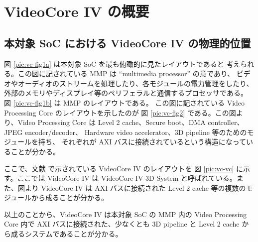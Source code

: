 \documentclass{jsarticle}
\begin{document}
\section{VideoCore IV の概要}

\subsection{本対象 SoC における VideoCore IV の物理的位置}

図 \ref{pic:vc-fig1a} は本対象 SoC を最も俯瞰的に見たレイアウトであると
考えられる。この図に記されている MMP は ``multimedia processor'' の意であり、
ビデオやオーディオのストリームを処理したり、各モジュールの電力管理をしたり、
外部のメモリやディスプレイ等のペリフェラルと通信するプロセッサである。
図 \ref{pic:vc-fig1b} は MMP のレイアウトである。
この図に記されている Video Processing Core のレイアウトを示したのが
図 \ref{pic:vc-fig2} である。この図より、Video Processing Core は
Level 2 cache、Secure boot、DMA controller、JPEG encoder/decoder、
Hardware video accelerator、3D pipeline 等のためのモジュールを持ち、
それぞれが AXI バスに接続されているという構造になっていることが分かる。

ここで、文献 \cite{vc-manual} で示されている VideoCore IV のレイアウトを
図 \ref{pic:vc-vc} に示す。ここでは VideoCore IV は
VideoCore IV 3D System と呼ばれている。また、図より VideoCore IV は
AXI バスに接続された Level 2 cache 等の複数のモジュールから成ることが分かる。

以上のことから、VideoCore IV は本対象 SoC の MMP 内の
Video Processing Core 内で AXI バスに接続された、少なくとも
3D pipeline と Level 2 cache から成るシステムであることが分かる。




\end{document}
